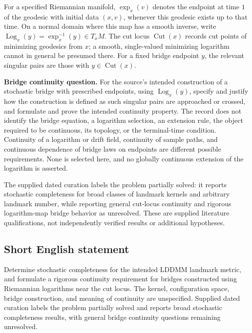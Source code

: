 \documentclass[11pt]{article}
\begin{document}
For a specified Riemannian manifold, \(\exp_x(v)\) denotes the endpoint at time \(1\) of the geodesic with initial data \((x,v)\), whenever this geodesic exists up to that time. On a normal domain where this map has a smooth inverse, write \(\operatorname{Log}_x(y)=\exp_x^{-1}(y)\in T_xM\). The cut locus \(\operatorname{Cut}(x)\) records cut points of minimizing geodesics from \(x\); a smooth, single-valued minimizing logarithm cannot in general be presumed there. For a fixed bridge endpoint \(y\), the relevant singular pairs are those with \(y\in\operatorname{Cut}(x)\).

\textbf{Bridge continuity question.} For the source's intended construction of a stochastic bridge with prescribed endpoints, using \(\operatorname{Log}_x(y)\), specify and justify how the construction is defined as such singular pairs are approached or crossed, and formulate and prove the intended continuity property. The record does not identify the bridge equation, a logarithm selection, an extension rule, the object required to be continuous, its topology, or the terminal-time condition. Continuity of a logarithm or drift field, continuity of sample paths, and continuous dependence of bridge laws on endpoints are different possible requirements. None is selected here, and no globally continuous extension of the logarithm is asserted.

The supplied dated curation labels the problem partially solved: it reports stochastic completeness for broad classes of landmark kernels and arbitrary landmark number, while reporting general cut-locus continuity and rigorous logarithm-map bridge behavior as unresolved. These are supplied literature qualifications, not independently verified results or additional hypotheses.
\subsection{Short English statement}
Determine stochastic completeness for the intended LDDMM landmark metric, and formulate a rigorous continuity requirement for bridges constructed using Riemannian logarithms near the cut locus. The kernel, configuration space, bridge construction, and meaning of continuity are unspecified. Supplied dated curation labels the problem partially solved and reports broad stochastic completeness results, with general bridge continuity questions remaining unresolved.
\end{document}
